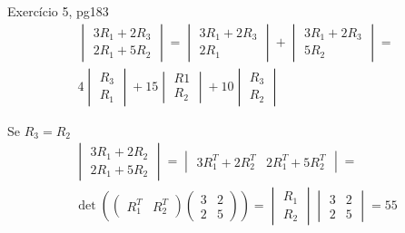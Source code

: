 \documentclass{beamer}
\begin{document}
\begin{frame}{Exercício 5, pg183}
\begin{gather*}
  \begin{vmatrix}
    3R_1 + 2 R_3 \\
    2R_1 +5 R_2
  \end{vmatrix} = \begin{vmatrix}
    3R_1 + 2R_3 \\ 
    2R_1
  \end{vmatrix} + \begin{vmatrix}
    3R_1 + 2 R_3 \\
    5R_2
  \end{vmatrix} = \\
 4 \begin{vmatrix}
    R_3 \\ R_1
  \end{vmatrix} + 15\begin{vmatrix}
    R1 \\ R_2
  \end{vmatrix} + 10 \begin{vmatrix}
    R_3 \\ R_2
  \end{vmatrix}
\end{gather*}
\end{frame}
\begin{frame}{Se $R_3 = R_2$}
  \begin{gather*}
    \begin{vmatrix}
      3R_1 + 2 R_2 \\
      2R_1 +5 R_2
    \end{vmatrix} = \begin{vmatrix}
      3R_1^T + 2 R_2^T &
      2R_1^T +5 R_2^T
    \end{vmatrix} = \\
    \det(\begin{pmatrix}
      R_1^T & R_2^T
    \end{pmatrix}\begin{pmatrix}
      3 & 2 \\ 2 & 5
    \end{pmatrix}) = \begin{vmatrix}
      R_1 \\ R_2
    \end{vmatrix}\begin{vmatrix}
      3 & 2 \\ 2 & 5
    \end{vmatrix} = 55
  \end{gather*}
\end{frame}
\end{document}
